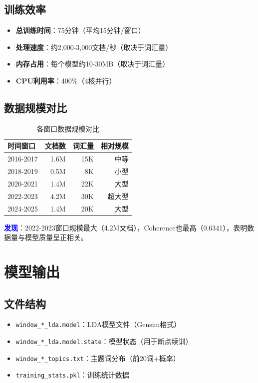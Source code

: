 \documentclass[11pt,a4paper]{article}
\begin{document}
\subsection{训练效率}

\begin{itemize}
    \item \textbf{总训练时间}：75分钟（平均15分钟/窗口）
    \item \textbf{处理速度}：约2,000-3,000文档/秒（取决于词汇量）
    \item \textbf{内存占用}：每个模型约10-30MB（取决于词汇量）
    \item \textbf{CPU利用率}：400\%（4核并行）
\end{itemize}

\subsection{数据规模对比}

\begin{table}[h]
\centering
\begin{tabular}{lrrr}
\toprule
\textbf{时间窗口} & \textbf{文档数} & \textbf{词汇量} & \textbf{相对规模} \\
\midrule
2016-2017 & 1.6M & 15K & 中等 \\
2018-2019 & 0.5M & 8K & 小型 \\
2020-2021 & 1.4M & 22K & 大型 \\
2022-2023 & 4.2M & 30K & 超大型 \\
2024-2025 & 1.4M & 20K & 大型 \\
\bottomrule
\end{tabular}
\caption{各窗口数据规模对比}
\end{table}

\textcolor{blue}{\textbf{发现}}：2022-2023窗口规模最大（4.2M文档），Coherence也最高（0.6341），表明数据量与模型质量呈正相关。

\section{模型输出}

\subsection{文件结构}

\begin{itemize}
    \item \texttt{window\_*\_lda.model}：LDA模型文件（Gensim格式）
    \item \texttt{window\_*\_lda.model.state}：模型状态（用于断点续训）
    \item \texttt{window\_*\_topics.txt}：主题词分布（前20词+概率）
    \item \texttt{training\_stats.pkl}：训练统计数据
\end{itemize}
\end{document}
